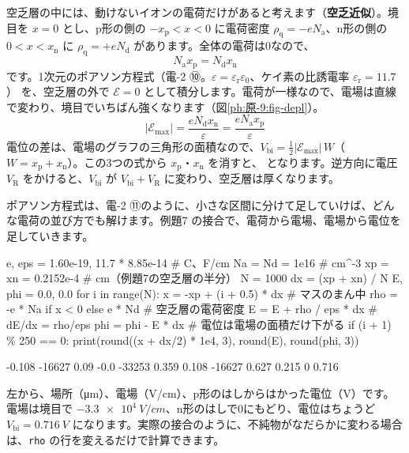 \label{ph:原-9:sec12}
空乏層の中には、動けないイオンの電荷だけがあると考えます（\textbf{空乏近似}）。境目を $x=0$ とし、p形の側の $-x_{\mathrm p}<x<0$ に電荷密度 $\rho_{\mathrm q}=-eN_{\mathrm a}$、n形の側の $0<x<x_{\mathrm n}$ に $\rho_{\mathrm q}=+eN_{\mathrm d}$ があります。全体の電荷は0なので、
\[ N_{\mathrm a}x_{\mathrm p}=N_{\mathrm d}x_{\mathrm n} \]
です。1次元のポアソン方程式（電-2 ⑩。$\varepsilon=\varepsilon_{\mathrm r}\varepsilon_0$、ケイ素の比誘電率 $\varepsilon_{\mathrm r}=11.7$）
\label{ph:原-9:poisson}を、空乏層の外で $\mathcal E=0$ として積分します。電荷が一様なので、電場は直線で変わり、境目でいちばん強くなります（図\ref{ph:原-9:fig-depl}）。
\[ |\mathcal E_{\max}|=\frac{eN_{\mathrm d}x_{\mathrm n}}{\varepsilon}=\frac{eN_{\mathrm a}x_{\mathrm p}}{\varepsilon} \]
電位の差は、電場のグラフの三角形の面積なので、$V_{\mathrm{bi}}=\tfrac12|\mathcal E_{\max}|\,W$（$W=x_{\mathrm p}+x_{\mathrm n}$）。この3つの式から $x_{\mathrm p}$・$x_{\mathrm n}$ を消すと、
\label{ph:原-9:W}となります。逆方向に電圧 $V_{\mathrm R}$ をかけると、$V_{\mathrm{bi}}$ が $V_{\mathrm{bi}}+V_{\mathrm R}$ に変わり、空乏層は厚くなります。

ポアソン方程式は、電-2 ⑪のように、小さな区間に分けて足していけば、どんな電荷の並び方でも解けます。例題7 の接合で、電荷から電場、電場から電位を足していきます。
\begin{phcode}[Python]
e, eps = 1.60e-19, 11.7 * 8.85e-14     \# C、F/cm
Na = Nd = 1e16                          \# cm\^{}-3
xp = xn = 0.2152e-4                     \# cm（例題7の空乏層の半分）
N = 1000
dx = (xp + xn) / N
E, phi = 0.0, 0.0
for i in range(N):
    x = -xp + (i + 0.5) * dx            \# マスのまん中
    rho = -e * Na if x < 0 else e * Nd  \# 空乏層の電荷密度
    E = E + rho / eps * dx              \# dE/dx = rho/eps
    phi = phi - E * dx                  \# 電位は電場の面積だけ下がる
    if (i + 1) \% 250 == 0:
        print(round((x + dx/2) * 1e4, 3), round(E), round(phi, 3))
\end{phcode}
\begin{phcodeout}[実行結果]
-0.108 -16627 0.09
-0.0 -33253 0.359
0.108 -16627 0.627
0.215 0 0.716
\end{phcodeout}
左から、場所（\si{\micro m}）、電場（V/cm）、p形のはしからはかった電位（V）です。電場は境目で $\qty{-3.3e4}{V/cm}$、n形のはしで0にもどり、電位はちょうど $V_{\mathrm{bi}}=\qty{0.716}{V}$ になります。実際の接合のように、不純物がなだらかに変わる場合は、\texttt{rho} の行を変えるだけで計算できます。

